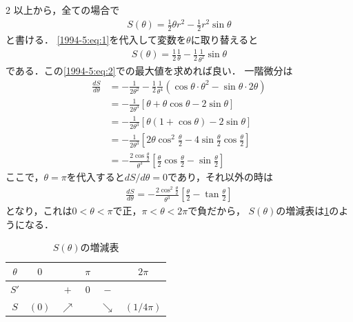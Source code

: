 \documentclass[../../../../main.tex]{subfiles}
\begin{document}
\begin{multicols}{2}
  \vspace{5pt}
  以上から，全ての場合で
  \begin{align*}
    S(\theta) = \frac{1}{2}\theta r^2 - \frac{1}{2}r^2\sin\theta
  \end{align*}
  と書ける．
  \cref{1994-5:eq:1}を代入して変数を$\theta$に取り替えると
  \begin{align*}
    S(\theta) = \frac{1}{2}\frac{1}{\theta} - \frac{1}{2} \frac{1}{\theta^2}\sin\theta
  \end{align*}
  である．この\cref{1994-5:eq:2}での最大値を求めれば良い．
  一階微分は
  \begin{align*}
    \frac{dS}{d\theta}
     & = -\frac{1}{2\theta^2} - \frac{1}{2} \frac{1}{\theta^4} (\cos\theta \cdot \theta^2 - \sin\theta \cdot 2\theta)     \\
     & = -\frac{1}{2\theta^3} [\theta + \theta\cos\theta - 2\sin\theta]                                                   \\
     & = -\frac{1}{2\theta^3} [\theta(1+\cos\theta) - 2\sin\theta]                                                        \\
     & = -\frac{1}{2\theta^3} [2\theta\cos^2\frac{\theta}{2} - 4\sin\frac{\theta}{2}\cos\frac{\theta}{2}]                 \\
     & = -\frac{2\cos\frac{\theta}{2}}{\theta^3} \left[\frac{\theta}{2}\cos\frac{\theta}{2} - \sin\frac{\theta}{2}\right]
  \end{align*}
  ここで，$\theta=\pi$を代入すると$dS/d\theta=0$であり，それ以外の時は
  \begin{align*}
    \frac{dS}{d\theta}= -\frac{2\cos^2\frac{\theta}{2}}{\theta^3} \left[\frac{\theta}{2} - \tan\frac{\theta}{2}\right]
  \end{align*}
  となり，これは$0<\theta<\pi$で正，$\pi<\theta<2\pi$で負だから，
  $S(\theta)$の増減表は\cref{1994-5:table:1}のようになる．

  \begin{table}[H]
    \centering
    \caption{$S(\theta)$の増減表}
    \label{1994-5:table:1}
    \begin{tabular}{|c||c|c|c|c|c|}
      \hline
      $\theta$ & $0$   &            & $\pi$ &            & $2\pi$     \\
      \hline
      $S'$     &       & $+$        & $0$   & $-$        &            \\
      \hline
      $S$      & $(0)$ & $\nearrow$ &       & $\searrow$ & $(1/4\pi)$ \\
      \hline
    \end{tabular}
  \end{table}


\end{multicols}
\end{document}
